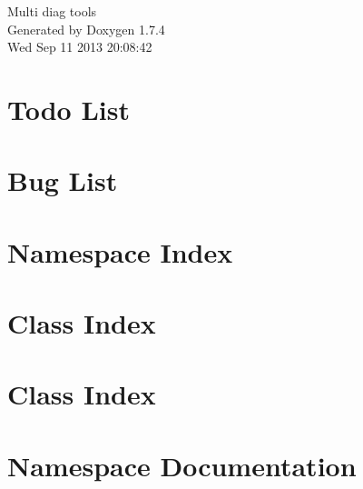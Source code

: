 \documentclass[a4paper]{book}
\begin{document}
\hypersetup{pageanchor=false}
\begin{titlepage}
\vspace*{7cm}
\begin{center}
{\Large Multi diag tools }\\
\vspace*{1cm}
{\large Generated by Doxygen 1.7.4}\\
\vspace*{0.5cm}
{\small Wed Sep 11 2013 20:08:42}\\
\end{center}
\end{titlepage}
\clearemptydoublepage
{}
\tableofcontents
\clearemptydoublepage
{}
\hypersetup{pageanchor=true}
\chapter{Todo List}
\label{todo}
\hypertarget{todo}{}

\chapter{Bug List}
\label{bug}
\hypertarget{bug}{}

\chapter{Namespace Index}

\chapter{Class Index}

\chapter{Class Index}

\chapter{Namespace Documentation}

\end{document}
